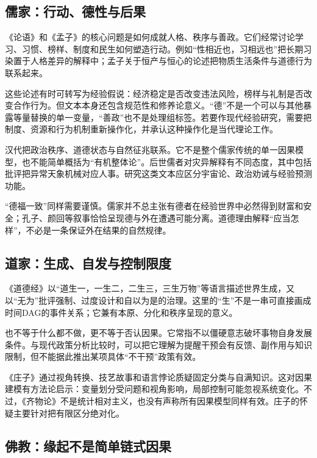 \subsection{儒家：行动、德性与后果}

《论语》和《孟子》的核心问题是如何成就人格、秩序与善政。它们经常讨论学习、习惯、榜样、制度和民生如何塑造行动。例如“性相近也，习相远也”把长期习染置于人格差异的解释中；孟子关于恒产与恒心的论述把物质生活条件与道德行为联系起来\parencite{analects,mencius}。

这些论述有时可转写为经验假说：经济稳定是否改变违法风险，榜样与礼制是否改变合作行为。但文本本身还包含规范性和修养论意义。“德”不是一个可以与其他暴露等量替换的单一变量，“善政”也不是处理组标签。若要作现代经验研究，需要把制度、资源和行为机制重新操作化，并承认这种操作化是当代理论工作。

汉代把政治秩序、道德状态与自然征兆联系。它不是整个儒家传统的单一因果模型，也不能简单概括为“有机整体论”。后世儒者对灾异解释有不同态度，其中包括批评把异常天象机械对应人事。研究这类文本应区分宇宙论、政治劝诫与经验预测功能。

“德福一致”同样需要谨慎。儒家并不总主张有德者在经验世界中必然得到财富和安全；孔子、颜回等叙事恰恰呈现德与外在遭遇可能分离。道德理由解释“应当怎样”，不必是一条保证外在结果的自然规律。

\subsection{道家：生成、自发与控制限度}

《道德经》以“道生一，一生二，二生三，三生万物”等语言描述世界生成，又以“无为”批评强制、过度设计和自以为是的治理\parencite{daodejing}。这里的“生”不是一串可直接画成时间DAG的事件关系；它兼有本原、分化和秩序呈现的意义。

也不等于什么都不做，更不等于否认因果。它常指不以僵硬意志破坏事物自身发展条件。与现代政策分析比较时，可以把它理解为提醒干预会有反馈、副作用与知识限制，但不能据此推出某项具体“不干预”政策有效。

《庄子》通过视角转换、技艺故事和语言悖论质疑固定分类与自满知识\parencite{zhuangzi}。这对因果建模有方法论启示：变量划分受问题和视角影响，局部控制可能忽视系统变化。不过，《齐物论》不是统计相对主义，也没有声称所有因果模型同样有效。庄子的怀疑主要针对把有限区分绝对化。

\subsection{佛教：缘起不是简单链式因果}

